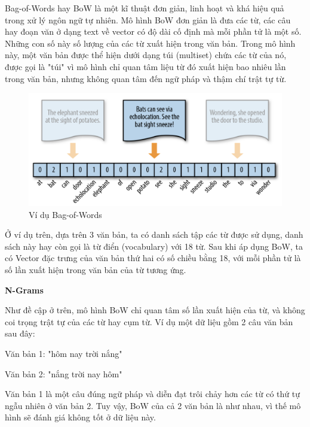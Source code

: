 \documentclass[12pt,a4paper,oneside]{book}
\begin{document}
	Bag-of-Words hay BoW là một kĩ thuật đơn giản, linh hoạt và khá hiệu quả trong xử lý ngôn ngữ tự nhiên. Mô hình BoW đơn giản là đưa các từ, các câu hay đoạn văn ở dạng text về vector có độ dài cố định mà mỗi phần tử là một số. Những con số này số lượng của các từ xuất hiện trong văn bản. Trong mô hình này, một văn bản được thể hiện dưới dạng túi (multiset) chứa các từ của nó, được gọi là "túi" vì mô hình chỉ quan tâm liệu từ đó xuất hiện bao nhiêu lần trong văn bản, nhưng không quan tâm đến ngữ pháp và thậm chí trật tự từ.
	
	\begin{figure}[H]
		\begin{center}
			\includegraphics[width=0.8\columnwidth]{bow.png}
		\end{center}
		\caption{Ví dụ Bag-of-Words}
	\end{figure}
	Ở ví dụ trên, dựa trên 3 văn bản, ta có danh sách tập các từ được sử dụng, danh sách này hay còn gọi là từ điển (vocabulary) với 18 từ. Sau khi áp dụng BoW, ta có Vector đặc trưng của văn bản thứ hai có số chiều bằng 18, với mỗi phần tử là số lần xuất hiện trong văn bản của từ tương ứng.
	
	\textbf{N-Grams}
	
	Như đề cập ở trên, mô hình BoW chỉ quan tâm số lần xuất hiện của từ, và không coi trọng trật tự của các từ hay cụm từ. Ví dụ một dữ liệu gồm 2 câu văn bản sau đây:
	
	\hspace{1cm} Văn bản 1: "hôm nay trời nắng"
	
	\hspace{1cm} Văn bản 2: "nắng trời nay hôm"
	
	Văn bản 1 là một câu đúng ngữ pháp và diễn đạt trôi chảy hơn các từ có thứ tự ngẫu nhiên ở văn bản 2. Tuy vậy, BoW của cả 2 văn bản là như nhau, vì thế mô hình sẽ đánh giá không tốt ở dữ liệu này.
	
\end{document}
